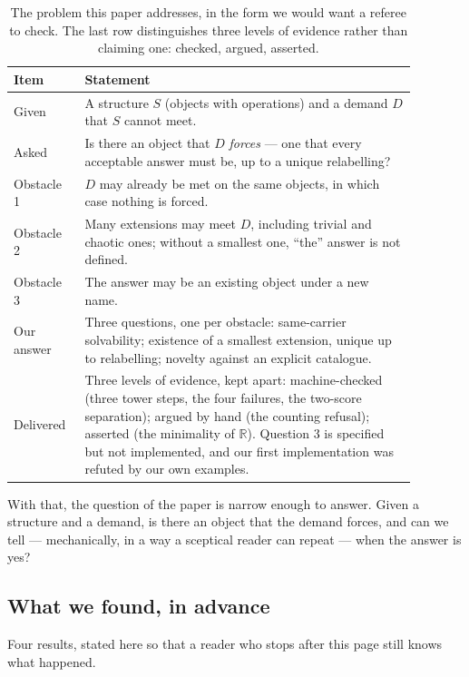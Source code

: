 \documentclass[aps,prd,preprint,superscriptaddress,amsmath,amssymb]{revtex4-2}
\begin{document}
\begin{table}[t]
\caption{The problem this paper addresses, in the form we would want a referee to
check.  The last row distinguishes three levels of evidence rather than claiming
one: checked, argued, asserted.}
\label{tab:problem}
\begin{ruledtabular}
\begin{tabular}{p{0.14\linewidth}p{0.74\linewidth}}
Item & Statement \\
\hline
Given & A structure $S$ (objects with operations) and a demand $D$ that $S$
cannot meet. \\
Asked & Is there an object that $D$ \emph{forces} --- one that every acceptable
answer must be, up to a unique relabelling? \\
Obstacle 1 & $D$ may already be met on the same objects, in which case nothing is
forced. \\
Obstacle 2 & Many extensions may meet $D$, including trivial and chaotic ones;
without a smallest one, ``the'' answer is not defined. \\
Obstacle 3 & The answer may be an existing object under a new name. \\
Our answer & Three questions, one per obstacle: same-carrier solvability;
existence of a smallest extension, unique up to relabelling; novelty against an
explicit catalogue. \\
Delivered & Three levels of evidence, kept apart: machine-checked (three tower
steps, the four failures, the two-score separation); argued by hand (the counting
refusal); asserted (the minimality of $\mathbb{R}$).  Question 3 is specified but
not implemented, and our first implementation was refuted by our own examples. \\
\end{tabular}
\end{ruledtabular}
\end{table}

With that, the question of the paper is narrow enough to answer.  Given a
structure and a demand, is there an object that the demand forces, and can we
tell --- mechanically, in a way a sceptical reader can repeat --- when the answer
is yes?

\subsection*{What we found, in advance}

Four results, stated here so that a reader who stops after this page still knows
what happened.
\end{document}
